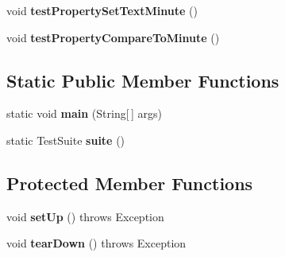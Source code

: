 \begin{DoxyCompactItemize}
\item 
\hypertarget{classorg_1_1joda_1_1time_1_1_test_partial___properties_ab919ca7d8481c0a519023ceaf54d0e08}{void {\bfseries test\-Property\-Set\-Text\-Minute} ()}\label{classorg_1_1joda_1_1time_1_1_test_partial___properties_ab919ca7d8481c0a519023ceaf54d0e08}

\item 
\hypertarget{classorg_1_1joda_1_1time_1_1_test_partial___properties_aaf764be7a6104159f21a5fa2e14ba886}{void {\bfseries test\-Property\-Compare\-To\-Minute} ()}\label{classorg_1_1joda_1_1time_1_1_test_partial___properties_aaf764be7a6104159f21a5fa2e14ba886}

\end{DoxyCompactItemize}
\subsection*{Static Public Member Functions}
\begin{DoxyCompactItemize}
\item 
\hypertarget{classorg_1_1joda_1_1time_1_1_test_partial___properties_a3cf1cdbefdc4e57dfd75e10068f9b934}{static void {\bfseries main} (String\mbox{[}$\,$\mbox{]} args)}\label{classorg_1_1joda_1_1time_1_1_test_partial___properties_a3cf1cdbefdc4e57dfd75e10068f9b934}

\item 
\hypertarget{classorg_1_1joda_1_1time_1_1_test_partial___properties_aff9922df5fc3cc853dae45a4bec99188}{static Test\-Suite {\bfseries suite} ()}\label{classorg_1_1joda_1_1time_1_1_test_partial___properties_aff9922df5fc3cc853dae45a4bec99188}

\end{DoxyCompactItemize}
\subsection*{Protected Member Functions}
\begin{DoxyCompactItemize}
\item 
\hypertarget{classorg_1_1joda_1_1time_1_1_test_partial___properties_a1cf40b37f26b285e17ecef6c4c1759d1}{void {\bfseries set\-Up} ()  throws Exception }\label{classorg_1_1joda_1_1time_1_1_test_partial___properties_a1cf40b37f26b285e17ecef6c4c1759d1}

\item 
\hypertarget{classorg_1_1joda_1_1time_1_1_test_partial___properties_af2e56ee4da4dc628df5a4ff764416ce2}{void {\bfseries tear\-Down} ()  throws Exception }\label{classorg_1_1joda_1_1time_1_1_test_partial___properties_af2e56ee4da4dc628df5a4ff764416ce2}

\end{DoxyCompactItemize}


